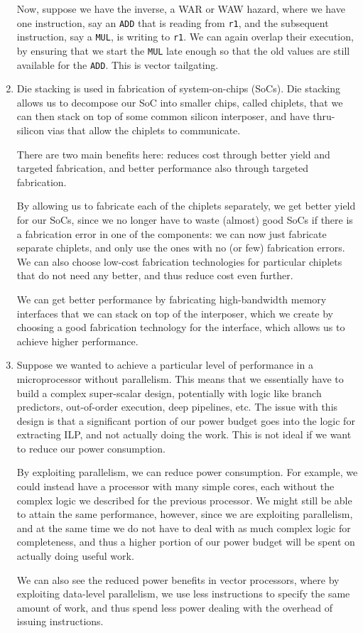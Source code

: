 \begin{enumerate}[label=(\alph*)]
    Now, suppose we have the inverse, a WAR or WAW hazard, where we have one instruction, say an \texttt{ADD} that is reading from \texttt{r1}, and the subsequent instruction, say a \texttt{MUL}, is writing to \texttt{r1}. We can again overlap their execution, by ensuring that we start the \texttt{MUL} late enough so that the old values are still available for the \texttt{ADD}. This is vector tailgating.

  \item
    Die stacking is used in fabrication of system-on-chips (SoCs). Die stacking allows us to decompose our SoC into smaller chips, called chiplets, that we can then stack on top of some common silicon interposer, and have thru-silicon vias that allow the chiplets to communicate.

    There are two main benefits here: reduces cost through better yield and targeted fabrication, and better performance also through targeted fabrication.

    By allowing us to fabricate each of the chiplets separately, we get better yield for our SoCs, since we no longer have to waste (almost) good SoCs if there is a fabrication error in one of the components: we can now just fabricate separate chiplets, and only use the ones with no (or few) fabrication errors. We can also choose low-cost fabrication technologies for particular chiplets that do not need any better, and thus reduce cost even further.

    We can get better performance by fabricating high-bandwidth memory interfaces that we can stack on top of the interposer, which we create by choosing a good fabrication technology for the interface, which allows us to achieve higher performance.


  \item
    Suppose we wanted to achieve a particular level of performance in a microprocessor without parallelism. This means that we essentially have to build a complex super-scalar design, potentially with logic like branch predictors, out-of-order execution, deep pipelines, etc. The issue with this design is that a significant portion of our power budget goes into the logic for extracting ILP, and not actually doing the work. This is not ideal if we want to reduce our power consumption.

    By exploiting parallelism, we can reduce power consumption. For example, we could instead have a processor with many simple cores, each without the complex logic we described for the previous processor. We might still be able to attain the same performance, however, since we are exploiting parallelism, and at the same time we do not have to deal with as much complex logic for completeness, and thus a higher portion of our power budget will be spent on actually doing useful work.

    We can also see the reduced power benefits in vector processors, where by exploiting data-level parallelism, we use less instructions to specify the same amount of work, and thus spend less power dealing with the overhead of issuing instructions.

        
\end{enumerate}

